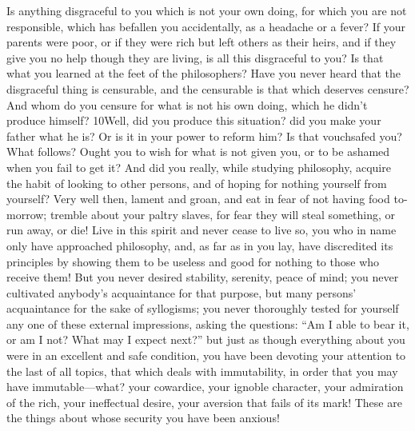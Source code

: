 Is anything disgraceful to you which is not your own doing, for which you are not responsible, which has befallen you accidentally, as a headache or a fever? If your parents were poor, or if they were rich but left others as their heirs, and if they give you no help though they are living, is all this disgraceful to you? Is that what you learned at the feet of the philosophers? Have you never heard that the disgraceful thing is censurable, and the censurable is that which deserves censure? And whom do you censure for what is not his own doing, which he didn't produce himself? 10Well, did you produce this situation? did you make your father what he is? Or is it in your power to reform him? Is that vouchsafed you? What follows? Ought you to wish for what is not given you, or to be ashamed when you fail to get it? And did you really, while studying philosophy, acquire the habit of looking to other persons, and of hoping for nothing yourself from yourself? Very well then, lament and groan, and eat in fear of not having food to-morrow; tremble about your paltry slaves, for fear they will steal something, or run away, or die! Live in this spirit and never cease to live so, you who in name only have approached philosophy, and, as far as in you lay, have discredited its principles by showing them to be useless and good for nothing to those who receive them! But you never desired stability, serenity, peace of mind; you never cultivated anybody's acquaintance for that purpose, but many persons' acquaintance for the sake of syllogisms; you never thoroughly tested for yourself any one of these external impressions, asking the questions: ``Am I able to bear it, or am I not? What may I expect next?'' but just as though everything about you were in an excellent and safe condition, you have been devoting your attention to the last of all topics, that which deals with immutability, in order that you may have immutable—what? your cowardice, your ignoble character, your admiration of the rich, your ineffectual desire, your aversion that fails of its mark! These are the things about whose security you have been anxious!


